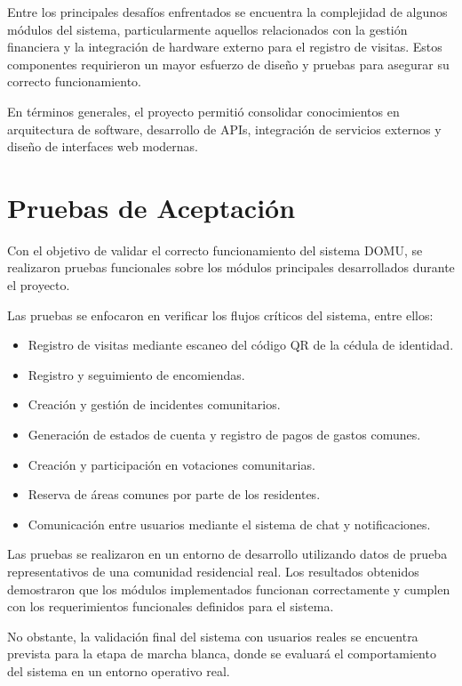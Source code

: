 Entre los principales desafíos enfrentados se encuentra la complejidad de algunos módulos del sistema, particularmente aquellos relacionados con la gestión financiera y la integración de hardware externo para el registro de visitas. 
Estos componentes requirieron un mayor esfuerzo de diseño y pruebas para asegurar su correcto funcionamiento.

En términos generales, el proyecto permitió consolidar conocimientos en arquitectura de software, desarrollo de APIs, integración de servicios externos y diseño de interfaces web modernas.


\section{Pruebas de Aceptación}

Con el objetivo de validar el correcto funcionamiento del sistema DOMU, se realizaron pruebas funcionales sobre los módulos principales desarrollados durante el proyecto.

Las pruebas se enfocaron en verificar los flujos críticos del sistema, entre ellos:

\begin{itemize}

\item Registro de visitas mediante escaneo del código QR de la cédula de identidad.
\item Registro y seguimiento de encomiendas.
\item Creación y gestión de incidentes comunitarios.
\item Generación de estados de cuenta y registro de pagos de gastos comunes.
\item Creación y participación en votaciones comunitarias.
\item Reserva de áreas comunes por parte de los residentes.
\item Comunicación entre usuarios mediante el sistema de chat y notificaciones.

\end{itemize}

Las pruebas se realizaron en un entorno de desarrollo utilizando datos de prueba representativos de una comunidad residencial real. 
Los resultados obtenidos demostraron que los módulos implementados funcionan correctamente y cumplen con los requerimientos funcionales definidos para el sistema.

No obstante, la validación final del sistema con usuarios reales se encuentra prevista para la etapa de marcha blanca, donde se evaluará el comportamiento del sistema en un entorno operativo real.


